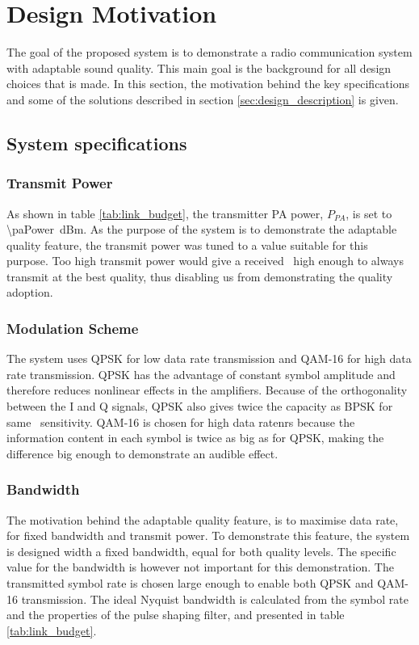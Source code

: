 \section{Design Motivation}
\label{sec:design_motivation}
The goal of the proposed system is to demonstrate a radio communication system with adaptable sound quality. This main goal is the background for all design choices that is made. In this section, the motivation behind the key specifications and some of the solutions described in section \ref{sec:design_description} is given.

\subsection{System specifications}
\subsubsection{Transmit Power}
As shown in table \ref{tab:link_budget}, the transmitter PA power, $P_{PA}$, is set to \SI{\paPower}{dBm}. As the purpose of the system is to demonstrate the adaptable quality feature, the transmit power was tuned to a value suitable for this purpose. Too high transmit power would give a received \ebnot\ high enough to always transmit at the best quality, thus disabling us from demonstrating the quality adoption. 

\subsubsection{Modulation Scheme}
The system uses QPSK for low data rate transmission and QAM-16 for high data rate transmission. QPSK has the advantage of constant symbol amplitude and therefore reduces nonlinear effects in the amplifiers. Because of the orthogonality between the I and Q signals, QPSK also gives twice the capacity as BPSK for same \ebnot\ sensitivity. QAM-16 is chosen for high data ratenrs because the information content in each symbol is twice as big as for QPSK, making the difference big enough to demonstrate an audible effect.

\subsubsection{Bandwidth}
The motivation behind the adaptable quality feature, is to maximise data rate, for fixed bandwidth and transmit power. To demonstrate this feature, the system is designed width a fixed bandwidth, equal for both quality levels. The specific value for the bandwidth is however not important for this demonstration. The transmitted symbol rate is chosen large enough to enable both QPSK and QAM-16 transmission. The ideal Nyquist bandwidth is calculated from the symbol rate and the properties of the pulse shaping filter, and presented in table \ref{tab:link_budget}. 

